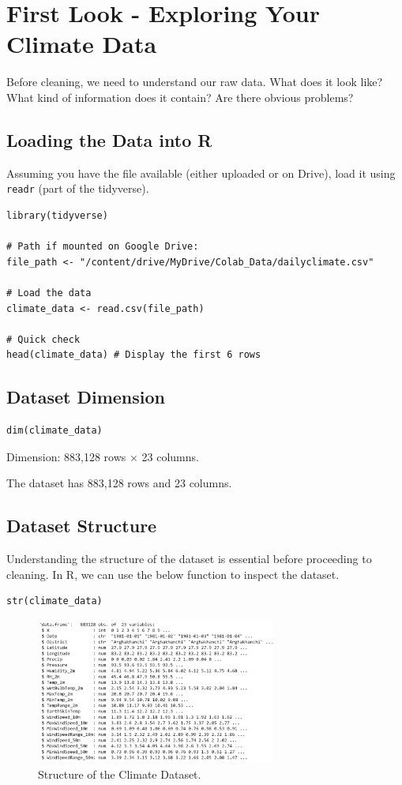 \section{First Look - Exploring Your Climate Data}

Before cleaning, we need to understand our raw data. What does it look like? What kind of information does it contain? Are there obvious problems?

\subsection{Loading the Data into R}

Assuming you have the file available (either uploaded or on Drive), load it using \texttt{readr} (part of the tidyverse).

\begin{verbatim}
library(tidyverse)

# Path if mounted on Google Drive:
file_path <- "/content/drive/MyDrive/Colab_Data/dailyclimate.csv"

# Load the data
climate_data <- read.csv(file_path)

# Quick check
head(climate_data) # Display the first 6 rows
\end{verbatim}

\subsection{Dataset Dimension}

\begin{verbatim}
dim(climate_data)
\end{verbatim}
Dimension: 883,128 rows $\times$ 23 columns.

The dataset has 883,128 rows and 23 columns.

\subsection{Dataset Structure}

Understanding the structure of the dataset is essential before proceeding to cleaning. In R, we can use the below function to inspect the dataset.

\begin{verbatim}
str(climate_data)
\end{verbatim}

\begin{figure}[h!]
    \centering
    \includegraphics[width=0.7\textwidth]{figures/raw.png}
    \caption{Structure of the Climate Dataset.}
\end{figure}

